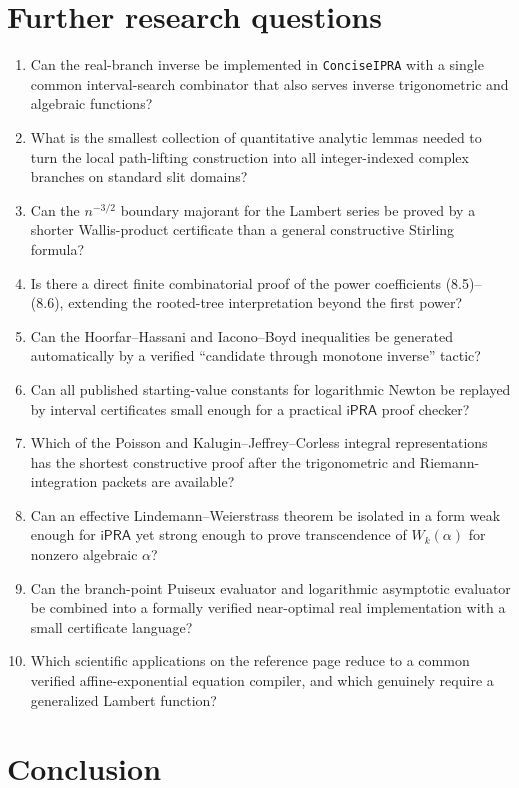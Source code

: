 \documentclass[11pt]{article}
\theoremstyle{definition}
\newcommand{\iPRA}{\mathsf{iPRA}}
\newcommand{\code}[1]{\nolinkurl{#1}}
\begin{document}
\section{Further research questions}\label{sec:further}

\begin{enumerate}
\item Can the real-branch inverse be implemented in \code{ConciseIPRA} with a
single common interval-search combinator that also serves inverse trigonometric
and algebraic functions?
\item What is the smallest collection of quantitative analytic lemmas needed to
turn the local path-lifting construction into all integer-indexed complex
branches on standard slit domains?
\item Can the \(n^{-3/2}\) boundary majorant for the Lambert series be proved by
a shorter Wallis-product certificate than a general constructive Stirling
formula?
\item Is there a direct finite combinatorial proof of the power coefficients
(8.5)--(8.6), extending the rooted-tree interpretation beyond the first power?
\item Can the Hoorfar--Hassani and Iacono--Boyd inequalities be generated
automatically by a verified ``candidate through monotone inverse'' tactic?
\item Can all published starting-value constants for logarithmic Newton be
replayed by interval certificates small enough for a practical \(\iPRA\)
proof checker?
\item Which of the Poisson and Kalugin--Jeffrey--Corless integral
representations has the shortest constructive proof after the trigonometric and
Riemann-integration packets are available?
\item Can an effective Lindemann--Weierstrass theorem be isolated in a form
weak enough for \(\iPRA\) yet strong enough to prove transcendence of
\(W_k(\alpha)\) for nonzero algebraic \(\alpha\)?
\item Can the branch-point Puiseux evaluator and logarithmic asymptotic evaluator
be combined into a formally verified near-optimal real implementation with a
small certificate language?
\item Which scientific applications on the reference page reduce to a common
verified affine-exponential equation compiler, and which genuinely require a
generalized Lambert function?
\end{enumerate}

\section{Conclusion}
\end{document}
